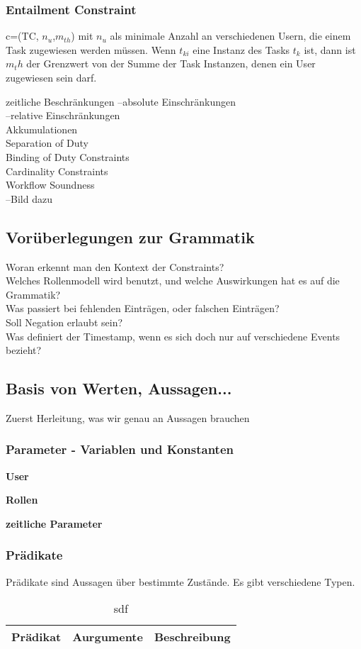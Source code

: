 \subsubsection{Entailment Constraint}
c=(TC, $n_u$,$m_{th}$) mit $n_u$ als minimale Anzahl an verschiedenen Usern, die einem Task zugewiesen werden müssen. Wenn $t_{ki}$ eine Instanz des Tasks $t_k$ ist, dann ist $m_th$ der Grenzwert von der Summe der Task Instanzen, denen ein User zugewiesen sein darf.
\cite{wolter_modeling_of_TBAC_in_BPMN}

zeitliche Beschränkungen
--absolute Einschränkungen\\
--relative Einschränkungen\\
Akkumulationen\\
Separation of Duty\\
Binding of Duty Constraints\\
Cardinality Constraints\\
Workflow Soundness\\
--Bild dazu\\


\subsection{Vorüberlegungen zur Grammatik}
Woran erkennt man den Kontext der Constraints? \\
Welches Rollenmodell wird benutzt, und welche Auswirkungen hat es auf die Grammatik?\\
Was passiert bei fehlenden Einträgen, oder falschen Einträgen?\\
Soll Negation erlaubt sein?\\
Was definiert der Timestamp, wenn es sich doch nur auf verschiedene Events bezieht?
\subsection{Basis von Werten, Aussagen...}
Zuerst Herleitung, was wir genau an Aussagen brauchen\\
\subsubsection{Parameter - Variablen und Konstanten}
\textbf{User}

\textbf{Rollen}

\textbf{zeitliche Parameter}

\subsubsection{Prädikate}
Prädikate sind Aussagen über bestimmte Zustände. Es gibt verschiedene Typen. \\
\begin{table}
\begin{tabular} {|c|c|c|}
Prädikat & Aurgumente & Beschreibung\\
\hline
\end{tabular}
\caption{sdf}
\label{tab:specification}
\end{table}


